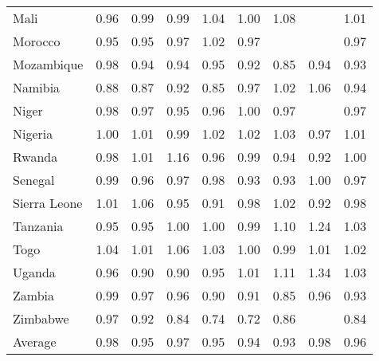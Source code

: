 \begin{table}[ht]
\begin{tabular}{lrrrrrrrr}
  Mali & 0.96 & 0.99 & 0.99 & 1.04 & 1.00 & 1.08 &  & 1.01 \\ 
  Morocco & 0.95 & 0.95 & 0.97 & 1.02 & 0.97 &  &  & 0.97 \\ 
  Mozambique & 0.98 & 0.94 & 0.94 & 0.95 & 0.92 & 0.85 & 0.94 & 0.93 \\ 
  Namibia & 0.88 & 0.87 & 0.92 & 0.85 & 0.97 & 1.02 & 1.06 & 0.94 \\ 
  Niger & 0.98 & 0.97 & 0.95 & 0.96 & 1.00 & 0.97 &  & 0.97 \\ 
  Nigeria & 1.00 & 1.01 & 0.99 & 1.02 & 1.02 & 1.03 & 0.97 & 1.01 \\ 
  Rwanda & 0.98 & 1.01 & 1.16 & 0.96 & 0.99 & 0.94 & 0.92 & 1.00 \\ 
  Senegal & 0.99 & 0.96 & 0.97 & 0.98 & 0.93 & 0.93 & 1.00 & 0.97 \\ 
  Sierra Leone & 1.01 & 1.06 & 0.95 & 0.91 & 0.98 & 1.02 & 0.92 & 0.98 \\ 
  Tanzania & 0.95 & 0.95 & 1.00 & 1.00 & 0.99 & 1.10 & 1.24 & 1.03 \\ 
  Togo & 1.04 & 1.01 & 1.06 & 1.03 & 1.00 & 0.99 & 1.01 & 1.02 \\ 
  Uganda & 0.96 & 0.90 & 0.90 & 0.95 & 1.01 & 1.11 & 1.34 & 1.03 \\ 
  Zambia & 0.99 & 0.97 & 0.96 & 0.90 & 0.91 & 0.85 & 0.96 & 0.93 \\ 
  Zimbabwe & 0.97 & 0.92 & 0.84 & 0.74 & 0.72 & 0.86 &  & 0.84 \\ 
  Average & 0.98 & 0.95 & 0.97 & 0.95 & 0.94 & 0.93 & 0.98 & 0.96 \\ 
   \hline
\end{tabular}
\end{table}
